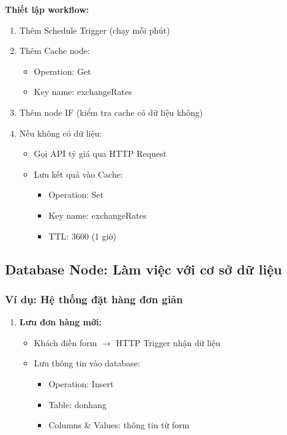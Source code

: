 \textbf{Thiết lập workflow:}
\begin{enumerate}
    \item Thêm Schedule Trigger (chạy mỗi phút)
    \item Thêm Cache node:
    \begin{itemize}
        \item Operation: Get
        \item Key name: exchangeRates
    \end{itemize}
    \item Thêm node IF (kiểm tra cache có dữ liệu không)
    \item Nếu không có dữ liệu:
    \begin{itemize}
        \item Gọi API tỷ giá qua HTTP Request
        \item Lưu kết quả vào Cache:
        \begin{itemize}
            \item Operation: Set
            \item Key name: exchangeRates
            \item TTL: 3600 (1 giờ)
        \end{itemize}
    \end{itemize}
\end{enumerate}

\subsection{Database Node: Làm việc với cơ sở dữ liệu}

\subsubsection{Ví dụ: Hệ thống đặt hàng đơn giản}

\begin{enumerate}
    \item \textbf{Lưu đơn hàng mới:}
    \begin{itemize}
        \item Khách điền form $\rightarrow$ HTTP Trigger nhận dữ liệu
        \item Lưu thông tin vào database:
        \begin{itemize}
            \item Operation: Insert
            \item Table: donhang
            \item Columns \& Values: thông tin từ form
        \end{itemize}
    \end{itemize}
\end{enumerate}


